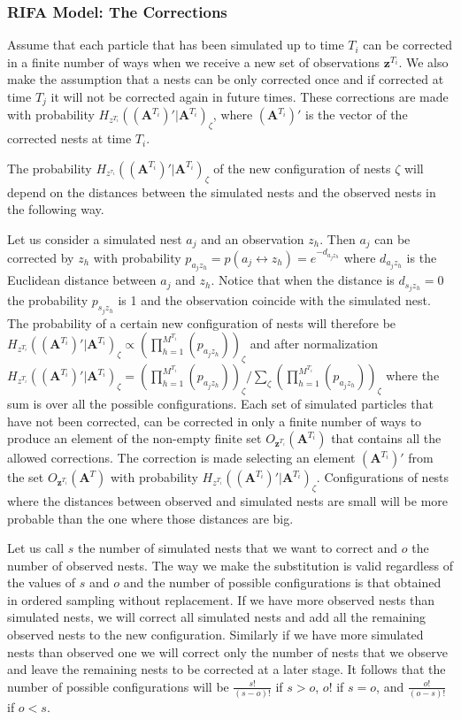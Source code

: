 \documentclass[9pt, xcolor={dvipsnames,svgnames,table}]{beamer}
\begin{document}
\begin{frame}
\frametitle{RIFA Model: The Corrections}
    Assume that each particle that has been simulated up to time $T_i$ can be corrected in a finite number of ways when we receive a new set of observations $\bm{z}^{T_i}$. We also make the assumption that a nests can be only corrected once and if corrected at time $T_j$ it will not be corrected again in future times. These corrections are made with probability $H_{z^{T_i}}((\bm{A}^{T_i})' | \bm{A}^{T_i})_{\zeta}$, where $(\bm{A}^{T_i})'$ is the vector of the corrected nests at time $T_i$.

    The probability $H_{z^{\tau_i}}((\bm{A}^{T_i})' | \bm{A}^{T_i})_{\zeta}$ of the new configuration of nests $\zeta$ will depend on the distances between the simulated nests and the observed nests in the following way. 
    
    Let us consider a simulated nest $a_j$ and an observation $z_h$. Then $a_j$ can be corrected by $z_h$ with probability $p_{a_j z_h} = p(a_j \leftrightarrow z_h) = e^{-d_{a_j z_h}}$ where $d_{a_j z_h}$ is the Euclidean distance between $a_j$ and $z_h$. Notice that when the distance is $d_{s_j z_h} = 0$ the probability $p_{s_j z_h}$ is 1 and the observation coincide with the simulated nest. The probability of a certain new configuration of nests will therefore be $H_{z^{T_i}}((\bm{A}^{T_i})' | \bm{A}^{T_i})_{\zeta} \propto (\prod_{h = 1}^{M^{T_i}} (p_{a_j z_h}))_{\zeta}$ and after normalization $H_{z^{T_i}}((\bm{A}^{T_i})' | \bm{A}^{T_i})_{\zeta} = (\prod_{h = 1}^{M^{T_i}} (p_{a_j z_h}))_{\zeta} / \sum_{\zeta} (\prod_{h = 1}^{M^{T_i}} (p_{a_j z_h}))_{\zeta} $ where the sum is over all the possible configurations. Each set of simulated particles that have not been corrected, can be corrected in only a finite number of ways to produce an element of the non-empty finite set $O_{\bm{z}^{T_i}} (\bm{A}^{T_i})$ that contains all the allowed corrections. The correction is made selecting an element $(\bm{A}^{T_i})'$ from the set $O_{\bm{z}^{T_i}} (\bm{A}^T)$ with probability $H_{z^{T_i}}((\bm{A}^{T_i})' | \bm{A}^{T_i})_{\zeta}$. Configurations of nests where the distances between observed and simulated nests are small will be more probable than the one where those distances are big.

    Let us call $s$ the number of simulated nests that we want to correct and $o$ the number of observed nests. The way we make the substitution is valid regardless of the values of $s$ and $o$ and the number of possible configurations is that obtained in ordered sampling without replacement. If we have more observed nests than simulated nests, we will correct all simulated nests and add all the remaining observed nests to the new configuration. Similarly if we have more simulated nests than observed one we will correct only the number of nests that we observe and leave the remaining nests to be corrected at a later stage.
    It follows that the number of possible configurations will be $\frac{s!}{(s-o)!}$ if $s > o$, $o!$ if $s = o$, and $\frac{o!}{(o-s)!}$ if $o < s$.


\end{frame}
\end{document}
